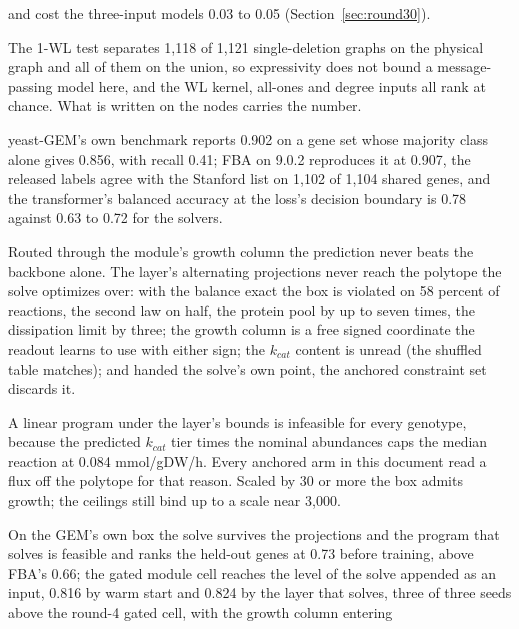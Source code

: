 \begin{description}
    and cost the three-input models 0.03 to 0.05 (Section~\ref{sec:round30}).
  \item[Structure is not the signal.] The 1-WL test separates 1,118 of 1,121
    single-deletion graphs on the physical graph and all of them on the union, so
    expressivity does not bound a message-passing model here, and the WL kernel, all-ones
    and degree inputs all rank at chance. What is written on the nodes carries the number.
  \item[Accuracy is the wrong statistic.] yeast-GEM's own benchmark reports 0.902 on a
    gene set whose majority class alone gives 0.856, with recall 0.41; FBA on 9.0.2
    reproduces it at 0.907, the released labels agree with the Stanford list on 1,102 of
    1,104 shared genes, and the transformer's balanced accuracy at the loss's decision
    boundary is 0.78 against 0.63 to 0.72 for the solvers.
  \item[The solve carries the module's value, and the alternating layer cannot compute it.]
    Routed through the module's growth column the prediction never beats the backbone
    alone. The layer's alternating projections never reach the polytope the solve
    optimizes over: with the balance exact the box is violated on 58 percent of reactions,
    the second law on half, the protein pool by up to seven times, the dissipation limit
    by three; the growth column is a free signed coordinate the readout learns to use
    with either sign; the $k_{cat}$ content is unread (the shuffled table matches); and
    handed the solve's own point, the anchored constraint set discards it.
  \item[The enzyme-capacity box as parameterized contains no growing flux.] A linear
    program under the layer's bounds is infeasible for every genotype, because the
    predicted $k_{cat}$ tier times the nominal abundances caps the median reaction at
    0.084 mmol/gDW/h. Every anchored arm in this document read a flux off the polytope
    for that reason. Scaled by 30 or more the box admits growth; the ceilings still bind
    up to a scale near 3,000.
  \item[On the polytope, the module helps.] On the GEM's own box the solve survives the
    projections and the program that solves is feasible and ranks the held-out genes at
    0.73 before training, above FBA's 0.66; the gated module cell reaches the level of the
    solve appended as an input, 0.816 by warm start and 0.824 by the layer that solves,
    three of three seeds above the round-4 gated cell, with the growth column entering

\end{description}
